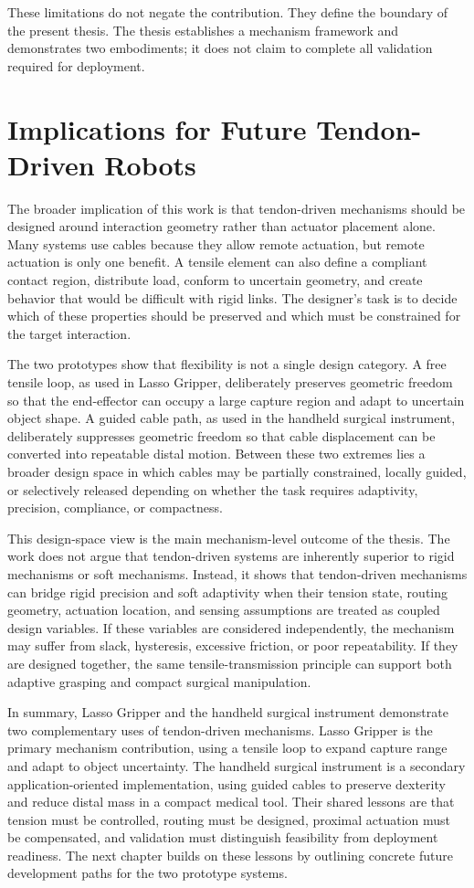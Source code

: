These limitations do not negate the contribution. They define the boundary of the present thesis. The thesis establishes a mechanism framework and demonstrates two embodiments; it does not claim to complete all validation required for deployment.

\section{Implications for Future Tendon-Driven Robots}

The broader implication of this work is that tendon-driven mechanisms should be designed around interaction geometry rather than actuator placement alone. Many systems use cables because they allow remote actuation, but remote actuation is only one benefit. A tensile element can also define a compliant contact region, distribute load, conform to uncertain geometry, and create behavior that would be difficult with rigid links. The designer's task is to decide which of these properties should be preserved and which must be constrained for the target interaction.

The two prototypes show that flexibility is not a single design category. A free tensile loop, as used in Lasso Gripper, deliberately preserves geometric freedom so that the end-effector can occupy a large capture region and adapt to uncertain object shape. A guided cable path, as used in the handheld surgical instrument, deliberately suppresses geometric freedom so that cable displacement can be converted into repeatable distal motion. Between these two extremes lies a broader design space in which cables may be partially constrained, locally guided, or selectively released depending on whether the task requires adaptivity, precision, compliance, or compactness.

This design-space view is the main mechanism-level outcome of the thesis. The work does not argue that tendon-driven systems are inherently superior to rigid mechanisms or soft mechanisms. Instead, it shows that tendon-driven mechanisms can bridge rigid precision and soft adaptivity when their tension state, routing geometry, actuation location, and sensing assumptions are treated as coupled design variables. If these variables are considered independently, the mechanism may suffer from slack, hysteresis, excessive friction, or poor repeatability. If they are designed together, the same tensile-transmission principle can support both adaptive grasping and compact surgical manipulation.

In summary, Lasso Gripper and the handheld surgical instrument demonstrate two complementary uses of tendon-driven mechanisms. Lasso Gripper is the primary mechanism contribution, using a tensile loop to expand capture range and adapt to object uncertainty. The handheld surgical instrument is a secondary application-oriented implementation, using guided cables to preserve dexterity and reduce distal mass in a compact medical tool. Their shared lessons are that tension must be controlled, routing must be designed, proximal actuation must be compensated, and validation must distinguish feasibility from deployment readiness. The next chapter builds on these lessons by outlining concrete future development paths for the two prototype systems.
